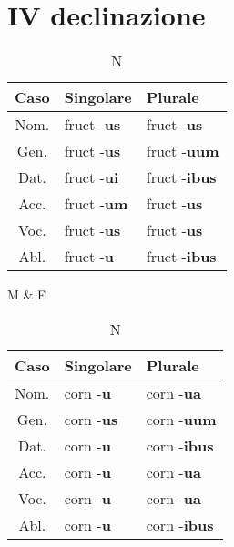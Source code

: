 \section{IV declinazione}

\begin{table}[h!]
    \begin{minipage}{.4\linewidth}
        \centering
        \begin{tabular}{|c|l|l|}
            \hline
            \textbf{Caso} & \textbf{Singolare} & \textbf{Plurale} \\
            \hline
            Nom. & fruct -\textbf{us} & fruct -\textbf{us} \\
            \hline
            Gen. & fruct -\textbf{us} & fruct -\textbf{uum} \\
            \hline
            Dat. & fruct -\textbf{ui} & fruct -\textbf{ibus} \\
            \hline
            Acc. & fruct -\textbf{um} & fruct -\textbf{us} \\
            \hline
            Voc. & fruct -\textbf{us} & fruct -\textbf{us} \\
            \hline
            Abl. & fruct -\textbf{u}  & fruct -\textbf{ibus} \\
            \hline
        \end{tabular}
        \caption{M \& F}
    \end{minipage}
    \hfill
    \begin{minipage}{.4\linewidth}
        \centering
        \begin{tabular}{|c|l|l|}
            \hline
            \textbf{Caso} & \textbf{Singolare} & \textbf{Plurale} \\
            \hline
            Nom. & corn -\textbf{u}  & corn -\textbf{ua} \\
            \hline
            Gen. & corn -\textbf{us} & corn -\textbf{uum} \\
            \hline
            Dat. & corn -\textbf{u}  & corn -\textbf{ibus} \\
            \hline
            Acc. & corn -\textbf{u}  & corn -\textbf{ua} \\
            \hline
            Voc. & corn -\textbf{u}  & corn -\textbf{ua} \\
            \hline
            Abl. & corn -\textbf{u}  & corn -\textbf{ibus} \\
            \hline
        \end{tabular}
        \caption{N}
    \end{minipage}
\end{table}


